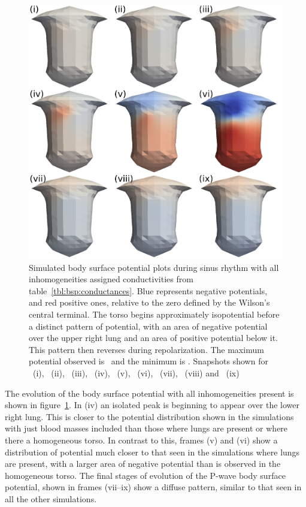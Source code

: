 \begin{figure}
\includegraphics{figures/bsp/bsp_all}
\caption[Body Surface Potential snapshots, with all inhomogeneities]{
\label{bsp:fig:all_bsp}
Simulated body surface potential plots during sinus rhythm with all
inhomogeneities assigned conductivities from table~\ref{tbl:bsp:conductances}.
Blue represents negative potentials, and red positive ones, relative to the zero
defined by the Wilson's central terminal.
The torso begins approximately isopotential before a distinct pattern of
potential, with an area of negative potential over the upper right lung and an
area of positive potential below it.
This pattern then reverses during repolarization.
The maximum potential observed is \ and the minimum is .
Snapshots shown for \ (i), \ (ii), \ (iii), \ (iv),
\ (v), \ (vi), \ (vii), \ (viii) and \
(ix)
}
\end{figure}

The evolution of the body surface potential with all inhomogeneities present is
shown in figure~\ref{bsp:fig:all_bsp}.
In (iv) an isolated peak is beginning to appear over the lower
right lung.
This is closer to the potential distribution shown in the simulations with just
blood masses included than those where lungs are present or where there a
homogeneous torso.
In contrast to this, frames (v) and (vi) show a distribution of potential much
closer to that seen in the simulations where lungs are present, with a larger
area of negative potential than is observed in the homogeneous torso.
The final stages of evolution of the P-wave body surface potential, shown in
frames (vii--ix) show a diffuse pattern, similar to that seen in all the other
simulations.

